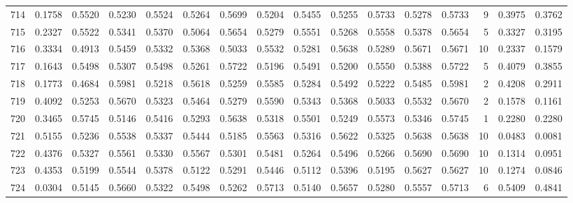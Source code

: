 \begin{tabular}{lrrrrrrrrrrrrrrr}
714 &      0.1758 &  0.5520 &  0.5230 &  0.5524 &  0.5264 &  0.5699 &  0.5204 &  0.5455 &  0.5255 &  0.5733 &   0.5278 &     0.5733 &      9 &                    0.3975 &                     0.3762 \\
715 &      0.2327 &  0.5522 &  0.5341 &  0.5370 &  0.5064 &  0.5654 &  0.5279 &  0.5551 &  0.5268 &  0.5558 &   0.5378 &     0.5654 &      5 &                    0.3327 &                     0.3195 \\
716 &      0.3334 &  0.4913 &  0.5459 &  0.5332 &  0.5368 &  0.5033 &  0.5532 &  0.5281 &  0.5638 &  0.5289 &   0.5671 &     0.5671 &     10 &                    0.2337 &                     0.1579 \\
717 &      0.1643 &  0.5498 &  0.5307 &  0.5498 &  0.5261 &  0.5722 &  0.5196 &  0.5491 &  0.5200 &  0.5550 &   0.5388 &     0.5722 &      5 &                    0.4079 &                     0.3855 \\
718 &      0.1773 &  0.4684 &  0.5981 &  0.5218 &  0.5618 &  0.5259 &  0.5585 &  0.5284 &  0.5492 &  0.5222 &   0.5485 &     0.5981 &      2 &                    0.4208 &                     0.2911 \\
719 &      0.4092 &  0.5253 &  0.5670 &  0.5323 &  0.5464 &  0.5279 &  0.5590 &  0.5343 &  0.5368 &  0.5033 &   0.5532 &     0.5670 &      2 &                    0.1578 &                     0.1161 \\
720 &      0.3465 &  0.5745 &  0.5146 &  0.5416 &  0.5293 &  0.5638 &  0.5318 &  0.5501 &  0.5249 &  0.5573 &   0.5346 &     0.5745 &      1 &                    0.2280 &                     0.2280 \\
721 &      0.5155 &  0.5236 &  0.5538 &  0.5337 &  0.5444 &  0.5185 &  0.5563 &  0.5316 &  0.5622 &  0.5325 &   0.5638 &     0.5638 &     10 &                    0.0483 &                     0.0081 \\
722 &      0.4376 &  0.5327 &  0.5561 &  0.5330 &  0.5567 &  0.5301 &  0.5481 &  0.5264 &  0.5496 &  0.5266 &   0.5690 &     0.5690 &     10 &                    0.1314 &                     0.0951 \\
723 &      0.4353 &  0.5199 &  0.5544 &  0.5378 &  0.5122 &  0.5291 &  0.5446 &  0.5112 &  0.5396 &  0.5195 &   0.5627 &     0.5627 &     10 &                    0.1274 &                     0.0846 \\
724 &      0.0304 &  0.5145 &  0.5660 &  0.5322 &  0.5498 &  0.5262 &  0.5713 &  0.5140 &  0.5657 &  0.5280 &   0.5557 &     0.5713 &      6 &                    0.5409 &                     0.4841 \\

\end{tabular}
